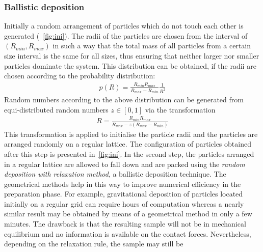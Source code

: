 \subsubsection{Ballistic deposition}
Initially a random arrangement of particles which do not touch each other is 
generated 
(~\cref{fig:ini}). The radii of the particles are chosen from the interval of 
$(\mathit{R}_{\mathit{min}},\mathit{R}_{\mathit{max}})$ in such a way that the 
total mass of all 
particles from a certain size interval is the same for all sizes, thus ensuring 
that neither 
larger 
nor smaller particles dominate the system. This distribution can be obtained, 
if the radii are 
chosen according to the probability distribution:
\begin{align}
\mathit{p}(\mathit{R})=\frac{\mathit{R}_{\mathit{min}}\mathit{R}_{\mathit{max}}}{\mathit{R}_{\mathit{max}}
 - \mathit{R}_{\mathit{min}}} \frac{1}{\mathit{R}^{2}}
\end{align}
Random numbers according to the above distribution can be generated from 
equi-distributed random 
numbers $\mathit{z}\in [0,1]$ via the transformation
\begin{align}
\mathit{R}=\frac{\mathit{R}_{\mathit{min}}\mathit{R}_{\mathit{max}}}{\mathit{R}_{\mathit{max}}
 - 
z(\mathit{R}_{\mathit{max}} - \mathit{R}_{\mathit{min}})}
\end{align}
This transformation is applied to initialise the particle radii and the 
particles are arranged 
randomly on a regular lattice. The configuration of particles obtained after 
this step is 
presented 
in~\cref{fig:ini}.
In the second step, the particles arranged in a regular lattice are allowed to 
fall down and are 
packed using the \textit{random deposition with relaxation method}, a ballistic 
deposition 
technique. The geometrical methods help in this way to improve numerical 
efficiency in the 
preparation phase. For example, gravitational deposition of particles located 
initially on a 
regular grid can require hours of computation whereas a nearly similar result 
may be obtained by 
means of a geometrical method in only a few minutes. The drawback is that the 
resulting sample 
will 
not be in mechanical equilibrium and no information is available on the contact 
forces. 
Nevertheless, depending on the relaxation rule, the sample may still be 
